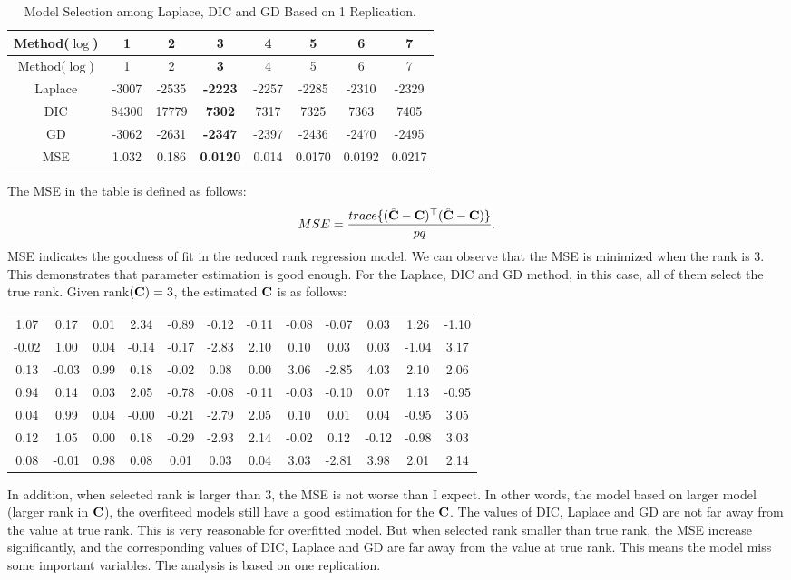 \documentclass[]{book}
\begin{document}
\begin{longtable}[]{@{}cccccccc@{}}
\caption{\label{tab:table1} Model Selection among Laplace, DIC and GD Based on 1 Replication.}\tabularnewline
\toprule
Method(\(\log\)) & 1 & 2 & \textbf{3} & 4 & 5 & 6 & 7\tabularnewline
\midrule
\endfirsthead
\toprule
Method(\(\log\)) & 1 & 2 & \textbf{3} & 4 & 5 & 6 & 7\tabularnewline
\midrule
\endhead
Laplace & -3007 & -2535 & \textbf{-2223} & -2257 & -2285 & -2310 & -2329\tabularnewline
DIC & 84300 & 17779 & \textbf{7302} & 7317 & 7325 & 7363 & 7405\tabularnewline
GD & -3062 & -2631 & \textbf{-2347} & -2397 & -2436 & -2470 & -2495\tabularnewline
MSE & 1.032 & 0.186 & \textbf{0.0120} & 0.014 & 0.0170 & 0.0192 & 0.0217\tabularnewline
\bottomrule
\end{longtable}

The MSE in the table is defined as follows:
\[
MSE = \frac{trace\{(\hat {\bf C}-{\bf C})^{{\top}}(\hat {\bf C}-{\bf C})\}}{pq}.
\]
MSE indicates the goodness of fit in the reduced rank regression model. We can observe that the MSE is minimized when the rank is 3. This demonstrates that parameter estimation is good enough. For the Laplace, DIC and GD method, in this case, all of them select the true rank. Given rank\(({\bf C})=3\), the estimated \({\bf C}\) is as follows:

\begin{longtable}[]{@{}cccccccccccc@{}}
\toprule
\endhead
1.07 & 0.17 & 0.01 & 2.34 & -0.89 & -0.12 & -0.11 & -0.08 & -0.07 & 0.03 & 1.26 & -1.10\tabularnewline
-0.02 & 1.00 & 0.04 & -0.14 & -0.17 & -2.83 & 2.10 & 0.10 & 0.03 & 0.03 & -1.04 & 3.17\tabularnewline
0.13 & -0.03 & 0.99 & 0.18 & -0.02 & 0.08 & 0.00 & 3.06 & -2.85 & 4.03 & 2.10 & 2.06\tabularnewline
0.94 & 0.14 & 0.03 & 2.05 & -0.78 & -0.08 & -0.11 & -0.03 & -0.10 & 0.07 & 1.13 & -0.95\tabularnewline
0.04 & 0.99 & 0.04 & -0.00 & -0.21 & -2.79 & 2.05 & 0.10 & 0.01 & 0.04 & -0.95 & 3.05\tabularnewline
0.12 & 1.05 & 0.00 & 0.18 & -0.29 & -2.93 & 2.14 & -0.02 & 0.12 & -0.12 & -0.98 & 3.03\tabularnewline
0.08 & -0.01 & 0.98 & 0.08 & 0.01 & 0.03 & 0.04 & 3.03 & -2.81 & 3.98 & 2.01 & 2.14\tabularnewline
\bottomrule
\end{longtable}

In addition, when selected rank is larger than 3, the MSE is not worse than I expect. In
other words, the model based on larger model (larger rank in \({\bf C}\)), the overfiteed models still have a good
estimation for the \({\bf C}\). The values of DIC, Laplace and GD are not far away from the value at true rank.
This is very reasonable for overfitted model. But when selected rank smaller than true rank,
the MSE increase significantly, and the corresponding values of DIC, Laplace and GD are far away from the value at true rank. This means the model miss some important variables. The analysis is based on one replication.
\end{document}
